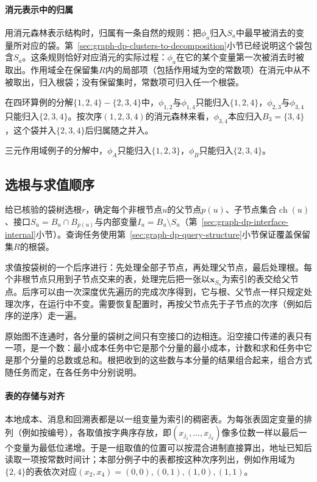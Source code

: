 \paragraph{消元表示中的归属}
用消元森林表示结构时，归属有一条自然的规则：把$\phi_a$归入$S_a$中最早被消去的变量所对应的袋。第~\ref{sec:graph-dp-clusters-to-decomposition}小节已经说明这个袋包含$S_a$。这条规则恰好对应消元的实际过程：$\phi_a$在它的某个变量第一次被消去时被取出。作用域全在保留集$R$内的局部项（包括作用域为空的常数项）在消元中从不被取出，归入根袋；没有保留集时，常数项可归入任一个根袋。

在四环算例的分解$\{1,2,4\}-\{2,3,4\}$中，$\phi_{1,2}$与$\phi_{1,4}$只能归入$\{1,2,4\}$，$\phi_{2,3}$与$\phi_{3,4}$只能归入$\{2,3,4\}$。按次序$(1,2,3,4)$的消元森林来看，$\phi_{3,4}$本应归入$B_3=\{3,4\}$，这个袋并入$\{2,3,4\}$后归属随之并入。

三元作用域例子的分解中，$\phi_A$只能归入$\{1,2,3\}$，$\phi_B$只能归入$\{2,3,4\}$。

\subsection{选根与求值顺序}
\label{sec:graph-dp-root-order}

给已核验的袋树选根$r$，确定每个非根节点$u$的父节点$p(u)$、子节点集合$\operatorname{ch}(u)$、接口$S_u=B_u\cap B_{p(u)}$与内部变量$I_u=B_u\setminus S_u$（第~\ref{sec:graph-dp-interface-internal}小节）。查询任务使用第~\ref{sec:graph-dp-query-structure}小节保证覆盖保留集$R$的根袋。

求值按袋树的一个后序进行：先处理全部子节点，再处理父节点，最后处理根。每个非根节点只用到子节点交来的表，处理完后把一张以$\bm x_{S_u}$为索引的表交给父节点。后序可以由一次深度优先遍历的完成次序得到，它与根、父节点一样只规定处理次序，在运行中不变。需要恢复配置时，再按父节点先于子节点的次序（例如后序的逆序）走一遍。

原始图不连通时，各分量的袋树之间只有空接口的边相连。沿空接口传递的表只有一项，是一个数：最小成本任务中它是那个分量的最小成本，计数和求和任务中它是那个分量的总数或总和。根把收到的这些数与本分量的结果组合起来，组合方式随任务而定，在各任务中分别说明。

\paragraph{表的存储与对齐}
本地成本、消息和回溯表都是以一组变量为索引的稠密表。为每张表固定变量的排列（例如按编号），各取值按字典序存放，即$(x_{j_1},\ldots,x_{j_k})$像多位数一样以最后一个变量为最低位递增。于是一组取值的位置可以按混合进制直接算出，地址已知后读取一项按常数时间计；本部分例子中的表都按这种次序列出，例如作用域为$\{2,4\}$的表依次对应$(x_2,x_4)=(0,0),(0,1),(1,0),(1,1)$。

